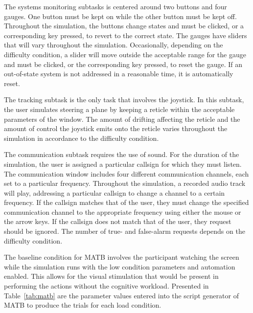 \documentclass[11pt]{article}
\begin{document}
The systems monitoring subtasks is centered around two buttons and four gauges. One button must be kept on while the other button must be kept off. Throughout the simulation, the buttons change states and must be clicked, or a corresponding key pressed, to revert to the correct state. The gauges have sliders that will vary throughout the simulation. Occasionally, depending on the difficulty condition, a slider will move outside the acceptable range for the gauge and must be clicked, or the corresponding key pressed, to reset the gauge. If an out-of-state system is not addressed in a reasonable time, it is automatically reset.

The tracking subtask is the only task that involves the joystick. In this subtask, the user simulates steering a plane by keeping a reticle within the acceptable parameters of the window. The amount of drifting affecting the reticle and the amount of control the joystick emits onto the reticle varies throughout the simulation in accordance to the difficulty condition.

The communication subtask requires the use of sound. For the duration of the simulation, the user is assigned a particular callsign for which they must listen. The communication window includes four different communication channels, each set to a particular frequency. Throughout the simulation, a recorded audio track will play, addressing a particular callsign to change a channel to a certain frequency. If the callsign matches that of the user, they must change the specified communication channel to the appropriate frequency using either the mouse or the arrow keys. If the callsign does not match that of the user, they request should be ignored. The number of true- and false-alarm requests depends on the difficulty condition. 

The baseline condition for MATB involves the participant watching the screen while the simulation runs with the low condition parameters and automation enabled. This allows for the visual stimulation that would be present in performing the actions without the cognitive workload. Presented in Table~\ref{tab:matb} are the parameter values entered into the script generator of MATB to produce the trials for each load condition.
\end{document}
